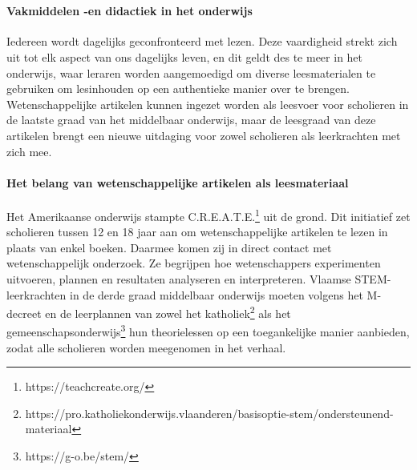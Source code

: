 
\chapter{}%
\label{ch:inleiding}

\subsubsection{Vakmiddelen -en didactiek in het onderwijs}

Iedereen wordt dagelijks geconfronteerd met lezen. Deze vaardigheid strekt zich uit tot elk aspect van ons dagelijks leven, en dit geldt des te meer in het onderwijs, waar leraren worden aangemoedigd om diverse leesmaterialen te gebruiken om lesinhouden op een authentieke manier over te brengen. Wetenschappelijke artikelen kunnen ingezet worden als leesvoer voor scholieren in de laatste graad van het middelbaar onderwijs, maar de leesgraad van deze artikelen brengt een nieuwe uitdaging voor zowel scholieren als leerkrachten met zich mee. 


\subsubsection{Het belang van wetenschappelijke artikelen als leesmateriaal}

Het Amerikaanse onderwijs stampte C.R.E.A.T.E.\footnote{https://teachcreate.org/} uit de grond. Dit initiatief zet scholieren tussen 12 en 18 jaar aan om wetenschappelijke artikelen te lezen in plaats van enkel boeken. Daarmee komen zij in direct contact met wetenschappelijk onderzoek. Ze begrijpen hoe wetenschappers experimenten uitvoeren, plannen en resultaten analyseren en interpreteren. Vlaamse STEM-leerkrachten in de derde graad middelbaar onderwijs moeten volgens het M-decreet en de leerplannen van zowel het katholiek\footnote{https://pro.katholiekonderwijs.vlaanderen/basisoptie-stem/ondersteunend-materiaal} als het gemeenschapsonderwijs\footnote{https://g-o.be/stem/} hun theorielessen op een toegankelijke manier aanbieden, zodat alle scholieren worden meegenomen in het verhaal. 


